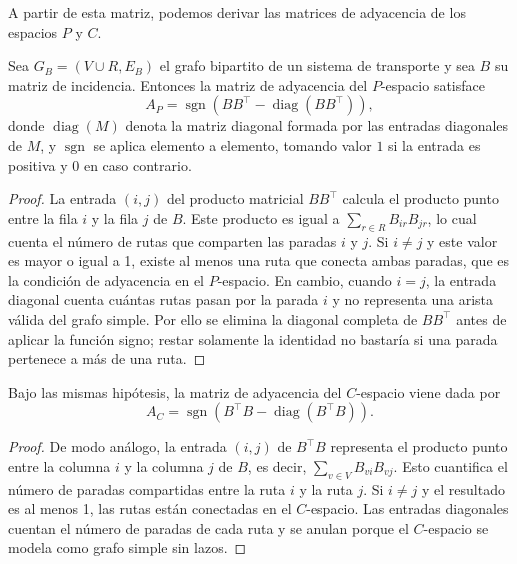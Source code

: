             A partir de esta matriz, podemos derivar las matrices de adyacencia de los espacios $P$ y $C$.

            \begin{proposicion}
            Sea $G_B = (V \cup R, E_B)$ el grafo bipartito de un sistema de transporte y sea $B$ su matriz de incidencia. Entonces la matriz de adyacencia del $P$-espacio satisface
            \[
                A_P = \operatorname{sgn}\!\left(B B^\top - \operatorname{diag}(B B^\top)\right),
            \]
            donde $\operatorname{diag}(M)$ denota la matriz diagonal formada por las entradas diagonales de $M$, y $\operatorname{sgn}$ se aplica elemento a elemento, tomando valor $1$ si la entrada es positiva y $0$ en caso contrario.
            \end{proposicion}

            \begin{proof} La entrada $(i,j)$ del producto matricial $B B^\top$ calcula el producto punto entre la fila $i$ y la fila $j$ de $B$. Este producto es igual a $\sum_{r \in R} B_{ir} B_{jr}$, lo cual cuenta el número de rutas que comparten las paradas $i$ y $j$. Si $i\neq j$ y este valor es mayor o igual a 1, existe al menos una ruta que conecta ambas paradas, que es la condición de adyacencia en el $P$-espacio. En cambio, cuando $i=j$, la entrada diagonal cuenta cuántas rutas pasan por la parada $i$ y no representa una arista válida del grafo simple. Por ello se elimina la diagonal completa de $B B^\top$ antes de aplicar la función signo; restar solamente la identidad no bastaría si una parada pertenece a más de una ruta.
            \end{proof}

            \begin{proposicion}
            Bajo las mismas hipótesis, la matriz de adyacencia del $C$-espacio viene dada por
            \[
                A_C = \operatorname{sgn}\!\left(B^\top B - \operatorname{diag}(B^\top B)\right).
            \]
            \end{proposicion}

            \begin{proof} De modo análogo, la entrada $(i,j)$ de $B^\top B$ representa el producto punto entre la columna $i$ y la columna $j$ de $B$, es decir, $\sum_{v \in V} B_{vi} B_{vj}$. Esto cuantifica el número de paradas compartidas entre la ruta $i$ y la ruta $j$. Si $i\neq j$ y el resultado es al menos 1, las rutas están conectadas en el $C$-espacio. Las entradas diagonales cuentan el número de paradas de cada ruta y se anulan porque el $C$-espacio se modela como grafo simple sin lazos.
            \end{proof}

